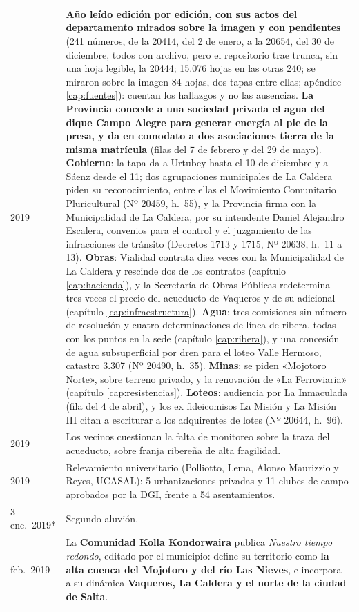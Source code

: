 \begin{longtable}{@{}p{2.7cm}p{10.3cm}@{}}
2019 & \textbf{Año leído edición por edición, con sus actos del departamento mirados sobre la imagen y con pendientes} (241 números, de la 20414, del 2 de enero, a la 20654, del 30 de diciembre, todos con archivo, pero el repositorio trae trunca, sin una hoja legible, la 20444; 15.076 hojas en las otras 240; se miraron sobre la imagen 84 hojas, dos tapas entre ellas; apéndice \ref{cap:fuentes}): cuentan los hallazgos y no las ausencias. \textbf{La Provincia concede a una sociedad privada el agua del dique Campo Alegre para generar energía al pie de la presa, y da en comodato a dos asociaciones tierra de la misma matrícula} (filas del 7 de febrero y del 29 de mayo). \textbf{Gobierno}: la tapa da a Urtubey hasta el 10 de diciembre y a Sáenz desde el 11; dos agrupaciones municipales de La Caldera piden su reconocimiento, entre ellas el Movimiento Comunitario Pluricultural (Nº 20459, h.\ 55), y la Provincia firma con la Municipalidad de La Caldera, por su intendente Daniel Alejandro Escalera, convenios para el control y el juzgamiento de las infracciones de tránsito (Decretos 1713 y 1715, Nº 20638, h.\ 11 a 13). \textbf{Obras}: Vialidad contrata diez veces con la Municipalidad de La Caldera y rescinde dos de los contratos (capítulo \ref{cap:hacienda}), y la Secretaría de Obras Públicas redetermina tres veces el precio del acueducto de Vaqueros y de su adicional (capítulo \ref{cap:infraestructura}). \textbf{Agua}: tres comisiones sin número de resolución y cuatro determinaciones de línea de ribera, todas con los puntos en la sede (capítulo \ref{cap:ribera}), y una concesión de agua subsuperficial por dren para el loteo Valle Hermoso, catastro 3.307 (Nº 20490, h.\ 35). \textbf{Minas}: se piden «Mojotoro Norte», sobre terreno privado, y la renovación de «La Ferroviaria» (capítulo \ref{cap:resistencias}). \textbf{Loteos}: audiencia por La Inmaculada (fila del 4 de abril), y los ex fideicomisos La Misión y La Misión III citan a escriturar a los adquirentes de lotes (Nº 20644, h.\ 96). \\
2019 & Los vecinos cuestionan la falta de monitoreo sobre la traza del acueducto, sobre franja ribereña de alta fragilidad. \\
2019 & Relevamiento universitario (Polliotto, Lema, Alonso Maurizzio y Reyes, UCASAL): 5 urbanizaciones privadas y 11 clubes de campo aprobados por la DGI, frente a 54 asentamientos. \\
3 ene.\ 2019* & Segundo aluvión. \\
feb.\ 2019 & La \textbf{Comunidad Kolla Kondorwaira} publica \textit{Nuestro tiempo redondo}, editado por el municipio: define su territorio como \textbf{la alta cuenca del Mojotoro y del río Las Nieves}, e incorpora a su dinámica \textbf{Vaqueros, La Caldera y el norte de la ciudad de Salta}. \\

\end{longtable}
